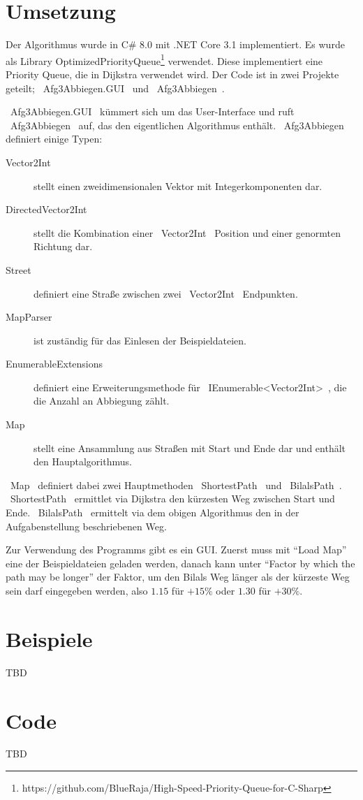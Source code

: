 \documentclass{article}
\theoremstyle{nonumberplain}
\begin{document}
\section{Umsetzung}

Der Algorithmus wurde in C\# 8.0 mit .NET Core 3.1 implementiert.
Es wurde als Library OptimizedPriorityQueue\footnote{https://github.com/BlueRaja/High-Speed-Priority-Queue-for-C-Sharp} verwendet. Diese implementiert eine Priority Queue, die in Dijkstra verwendet wird.
Der Code ist in zwei Projekte geteilt;
~Afg3Abbiegen.GUI~ und ~Afg3Abbiegen~.

~Afg3Abbiegen.GUI~ kümmert sich um das User-Interface und ruft ~Afg3Abbiegen~ auf, das den eigentlichen Algorithmus enthält.
~Afg3Abbiegen~ definiert einige Typen:

\begin{description}
    \item[Vector2Int] stellt einen zweidimensionalen Vektor mit Integerkomponenten dar.
    \item[DirectedVector2Int] stellt die Kombination einer ~Vector2Int~ Position und einer genormten Richtung dar.
    \item[Street] definiert eine Straße zwischen zwei ~Vector2Int~ Endpunkten.
    \item[MapParser] ist zuständig für das Einlesen der Beispieldateien.
    \item[EnumerableExtensions] definiert eine Erweiterungsmethode für ~IEnumerable<Vector2Int>~, die die Anzahl an Abbiegung zählt.
    \item[Map] stellt eine Ansammlung aus Straßen mit Start und Ende dar und enthält den Hauptalgorithmus. 
\end{description}

~Map~ definiert dabei zwei Hauptmethoden
~ShortestPath~ und ~BilalsPath~.
~ShortestPath~ ermittlet via Dijkstra den kürzesten Weg zwischen Start und Ende.
~BilalsPath~ ermittelt via dem obigen Algorithmus den in der Aufgabenstellung beschriebenen Weg.

Zur Verwendung des Programms gibt es ein GUI.
Zuerst muss mit ``Load Map'' eine der Beispieldateien geladen werden, danach kann unter ``Factor by which the path may be longer'' der Faktor, um den Bilals Weg länger als der kürzeste Weg sein darf eingegeben werden, also \(1.15\) für \(+15\%\) oder \(1.30\) für \(+30\%\).

\section{Beispiele}

TBD

\section{Code}

TBD
\end{document}
